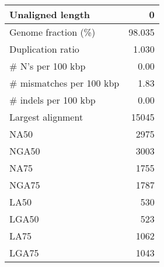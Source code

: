 \documentclass[12pt,a4paper]{article}
\begin{document}
\begin{table}[ht]
\begin{center}
\begin{tabular}{|l*{1}{|r}|}
Unaligned length & 0 \\ \hline
Genome fraction (\%) & 98.035 \\ \hline
Duplication ratio & 1.030 \\ \hline
\# N's per 100 kbp & 0.00 \\ \hline
\# mismatches per 100 kbp & 1.83 \\ \hline
\# indels per 100 kbp & 0.00 \\ \hline
Largest alignment & 15045 \\ \hline
NA50 & 2975 \\ \hline
NGA50 & 3003 \\ \hline
NA75 & 1755 \\ \hline
NGA75 & 1787 \\ \hline
LA50 & 530 \\ \hline
LGA50 & 523 \\ \hline
LA75 & 1062 \\ \hline
LGA75 & 1043 \\ \hline
\end{tabular}
\end{center}
\end{table}
\end{document}
